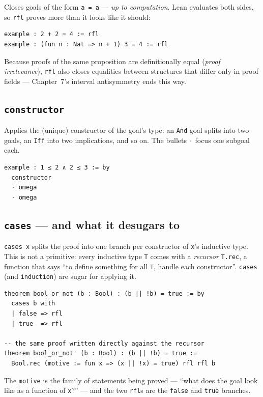 \documentclass[12pt, a4paper, openright]{book}
\theoremstyle{thmstyle}
\theoremstyle{defstyle}
\newcommand{\lc}[1]{\texttt{#1}}
\begin{document}
Closes goals of the form \lc{a = a} --- \emph{up to computation}. Lean
evaluates both sides, so \lc{rfl} proves more than it looks like it should:

\begin{verbatim}
example : 2 + 2 = 4 := rfl
example : (fun n : Nat => n + 1) 3 = 4 := rfl
\end{verbatim}

Because proofs of the same proposition are definitionally equal
(\emph{proof irrelevance}), \lc{rfl} also closes equalities between
structures that differ only in proof fields --- Chapter~7's interval
antisymmetry ends this way.

\subsection*{\lc{constructor}}

Applies the (unique) constructor of the goal's type: an \lc{And} goal
splits into two goals, an \lc{Iff} into two implications, and so on. The
bullets \lc{·} focus one subgoal each.

\begin{verbatim}
example : 1 ≤ 2 ∧ 2 ≤ 3 := by
  constructor
  · omega
  · omega
\end{verbatim}

\subsection*{\lc{cases} --- and what it desugars to}

\lc{cases x} splits the proof into one branch per constructor of \lc{x}'s
inductive type. This is not a primitive: every inductive type \lc{T} comes
with a \emph{recursor} \lc{T.rec}, a function that says ``to define
something for all \lc{T}, handle each constructor''. \lc{cases} (and
\lc{induction}) are sugar for applying it.

\begin{verbatim}
theorem bool_or_not (b : Bool) : (b || !b) = true := by
  cases b with
  | false => rfl
  | true  => rfl

-- the same proof written directly against the recursor
theorem bool_or_not' (b : Bool) : (b || !b) = true :=
  Bool.rec (motive := fun x => (x || !x) = true) rfl rfl b
\end{verbatim}

The \lc{motive} is the family of statements being proved --- ``what does
the goal look like as a function of \lc{x}?'' --- and the two \lc{rfl}s are
the \lc{false} and \lc{true} branches.
\end{document}
